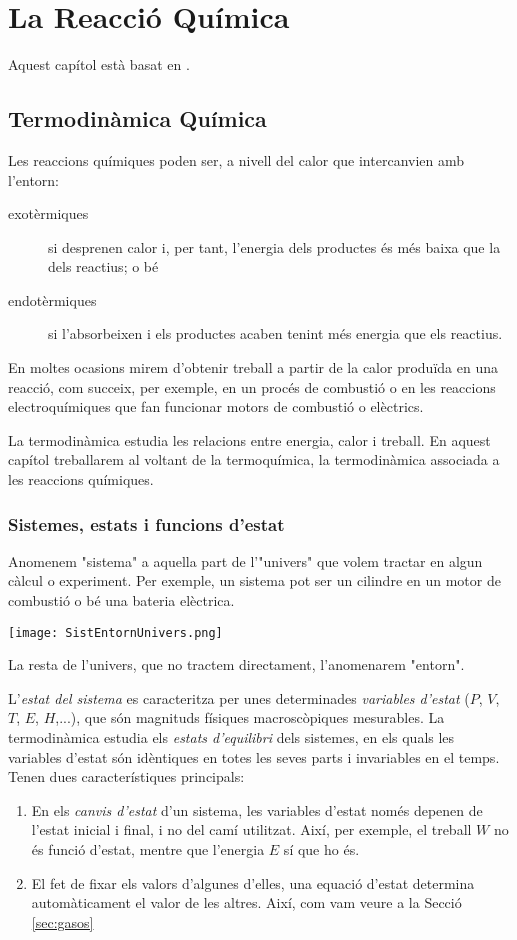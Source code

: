 \chapter{La Reacció Química}

Aquest capítol està basat en \cite{caamano_ros_quimica_1991,yen_chemistry_2008,dickerson_principios_1993}.

\section{Termodinàmica Química}

Les reaccions químiques poden ser, a nivell del calor que intercanvien amb l'entorn:
\begin{description}
\item[exotèrmiques] si desprenen calor i, per tant, l'energia dels productes és més baixa que la dels reactius; o bé
\item[endotèrmiques] si l'absorbeixen i els productes acaben tenint més energia que els reactius.
\end{description}

En moltes ocasions mirem d'obtenir treball a partir de la calor produïda en una reacció, com succeix, per exemple, en un procés de combustió o en les reaccions electroquímiques que fan funcionar motors de combustió o elèctrics.

La termodinàmica estudia les relacions entre energia, calor i treball.
En aquest capítol treballarem al voltant de la termoquímica, la termodinàmica associada a les reaccions químiques. 


\subsection{Sistemes, estats i funcions d'estat}

Anomenem "sistema" a aquella part de l'"univers" que volem tractar en algun càlcul o experiment. 
Per exemple, un sistema pot ser un cilindre en un motor de combustió o bé una bateria elèctrica.
\begin{center}
\texttt{[image: SistEntornUnivers.png]}
\end{center}
La resta de l'univers, que no tractem directament, l'anomenarem "entorn".

L'\textit{estat del sistema} es caracteritza  per unes determinades \textit{variables d'estat} ($P$, $V$, $T$, $E$, $H$,...), que són magnituds físiques macroscòpiques mesurables. La termodinàmica estudia els \textit{estats d'equilibri} dels sistemes, en els quals les variables d'estat són idèntiques en totes les seves parts i invariables en el temps.
Tenen dues característiques principals:
\begin{enumerate}
\item En els \textit{canvis d'estat} d'un sistema, les variables d'estat només depenen de l'estat inicial i final, i no del camí utilitzat. Així, per exemple, el treball $W$ no és funció d'estat, mentre que l'energia $E$ sí que ho és.
\item El fet de fixar els valors d'algunes d'elles, una equació d'estat determina automàticament el valor de les altres. Així, com vam veure a la Secció \ref{sec:gasos}
\end{enumerate}

